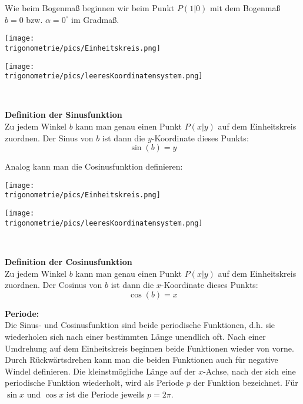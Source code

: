 Wie beim Bogenmaß beginnen wir beim Punkt \(P(1\vert 0)\) mit dem Bogenmaß \(b=0\) bzw. \(\alpha=0^\circ\) im Gradmaß.\\
\begin{minipage}{\textwidth}
	\begin{minipage}{.26\textwidth}
		\texttt{[image: \\trigonometrie/pics/Einheitskreis.png]}
	\end{minipage}
	\begin{minipage}{.74\textwidth}
		\texttt{[image: \\trigonometrie/pics/leeresKoordinatensystem.png]}
	\end{minipage}
\end{minipage}\\
\begin{tcolorbox}
	\textbf{Definition der Sinusfunktion}\\
	\textcolor{loestc}{Zu jedem Winkel \(b\) kann man genau einen Punkt \(P(x\vert y)\) auf dem Einheitskreis zuordnen. Der Sinus von \(b\) ist dann die \(y\)-Koordinate dieses Punkts:
		\[\sin\left(b\right)=y\]		
	}
\end{tcolorbox}
Analog kann man die Cosinusfunktion definieren:\\
\begin{minipage}{\textwidth}
	\begin{minipage}{.26\textwidth}
		\texttt{[image: \\trigonometrie/pics/Einheitskreis.png]}
	\end{minipage}
	\begin{minipage}{.74\textwidth}
		\texttt{[image: \\trigonometrie/pics/leeresKoordinatensystem.png]}
	\end{minipage}
\end{minipage}\\
\begin{tcolorbox}
	\textbf{Definition der Cosinusfunktion}\\
	\textcolor{loestc}{Zu jedem Winkel \(b\) kann man genau einen Punkt \(P(x\vert y)\) auf dem Einheitskreis zuordnen. Der Cosinus von \(b\) ist dann die \(x\)-Koordinate dieses Punkts:
		\[\cos\left(b\right)=x\]		
	}
\end{tcolorbox}
\textbf{Periode:}\\
\textcolor{loes}{Die Sinus- und Cosinusfunktion sind beide periodische Funktionen, d.h. sie wiederholen sich nach einer bestimmten Länge unendlich oft. Nach einer Umdrehung auf dem Einheitskreis beginnen beide Funktionen wieder von vorne. Durch Rückwärtsdrehen kann man die beiden Funktionen auch für negative Windel definieren. Die kleinstmögliche Länge auf der \(x\)-Achse, nach der sich eine periodische Funktion wiederholt, wird als Periode \(p\) der Funktion bezeichnet. Für \(\sin x\) und \(\cos x\) ist die Periode jeweils \(p=2\pi\).}